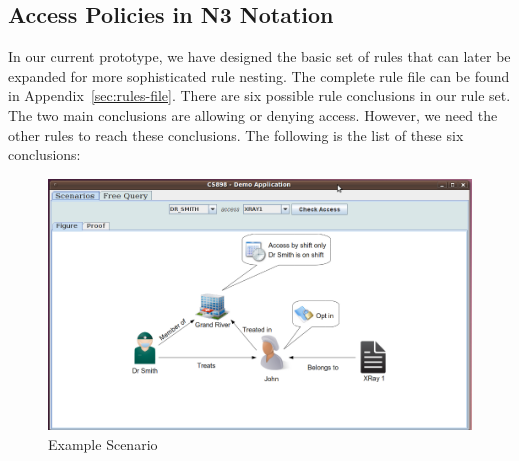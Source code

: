 \documentclass[conference]{IEEEtran}
\begin{document}
\subsection{Access Policies in N3 Notation}
\label{rules-sec}

In our current prototype, we have designed the basic set of rules that can later be expanded for more sophisticated rule nesting. The complete rule file can be
found in Appendix~\ref{sec:rules-file}. There are six possible rule conclusions in our rule set. The two main conclusions are allowing or denying
access. However, we need the other rules to reach these conclusions. The following is the list of these six conclusions:

\begin{figure}[!t]
 \centering
 \includegraphics[scale=0.25,keepaspectratio=true]{./main.png}
 \caption{Example Scenario}
 \label{fig:mainscreen}
\end{figure}
\end{document}

